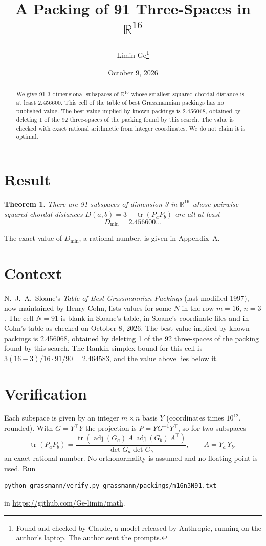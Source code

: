 \documentclass[11pt,a4paper]{article}
\title{A Packing of 91 Three-Spaces in $\mathbb{R}^{16}$}
\author{Limin Ge\thanks{Found and checked by Claude, a model released by Anthropic, running on the author's laptop. The author sent the prompts.}}
\date{October 9, 2026}
\newtheorem*{theorem}{Theorem}
\begin{document}
\maketitle
\begin{abstract}
We give 91 3-dimensional subspaces of $\mathbb{R}^{16}$ whose smallest squared chordal distance is at least 2.456600. This cell of the table of best Grassmannian packings has no published value. The best value implied by known packings is 2.456068, obtained by deleting 1 of the 92 three-spaces of the packing found by this search. The value is checked with exact rational arithmetic from integer coordinates. We do not claim it is optimal.
\end{abstract}

\section{Result}
\begin{theorem}
There are 91 subspaces of dimension 3 in $\mathbb{R}^{16}$ whose pairwise squared chordal distances $D(a,b) = 3 - \operatorname{tr}(P_aP_b)$ are all at least
\[ D_{\min} = 2.456600\ldots \]
\end{theorem}
The exact value of $D_{\min}$, a rational number, is given in Appendix~A.


\section{Context}
N.~J.~A.~Sloane's \emph{Table of Best Grassmannian Packings} (last modified 1997), now maintained by Henry Cohn, lists values for some $N$ in the row $m=16$, $n=3$. The cell $N=91$ is blank in Sloane's table, in Sloane's coordinate files and in Cohn's table as checked on October 8, 2026. The best value implied by known packings is 2.456068, obtained by deleting 1 of the 92 three-spaces of the packing found by this search. The Rankin simplex bound for this cell is $3(16-3)/16\cdot 91/90 = 2.464583$, and the value above lies below it.


\section{Verification}
Each subspace is given by an integer $m\times n$ basis $Y$ (coordinates times $10^{12}$, rounded). With $G=Y^\top Y$ the projection is $P=YG^{-1}Y^\top$, so for two subspaces
\[ \operatorname{tr}(P_aP_b)=\frac{\operatorname{tr}(\operatorname{adj}(G_a)\,A\,\operatorname{adj}(G_b)\,A^\top)}{\det G_a\det G_b},\qquad A=Y_a^\top Y_b, \]
an exact rational number. No orthonormality is assumed and no floating point is used. Run
\begin{verbatim}
python grassmann/verify.py grassmann/packings/m16n3N91.txt
\end{verbatim}
in \url{https://github.com/Ge-limin/math}.
\end{document}
